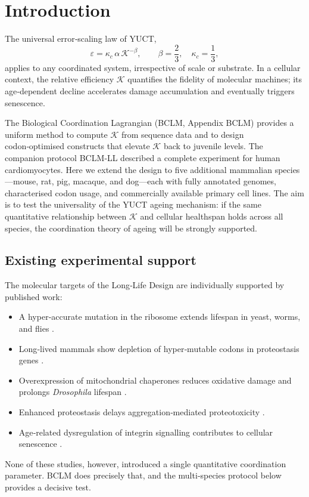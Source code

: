 \documentclass[12pt,a4paper]{article}
\newcommand{\REL}{\mathcal{K}}          %
\begin{document}
	\tableofcontents
	\newpage
	
	\section{Introduction}
	\label{sec:intro}
	The universal error‑scaling law of YUCT,
	\begin{equation}
		\varepsilon = \kappa_c \, \alpha \, \REL^{-\beta}, \qquad \beta = \frac{2}{3},\quad \kappa_c = \frac{1}{3},
		\label{eq:error-law}
	\end{equation}
	applies to any coordinated system, irrespective of scale or substrate. In a cellular context, the relative efficiency \(\REL\) quantifies the fidelity of molecular machines; its age‑dependent decline accelerates damage accumulation and eventually triggers senescence.
	
	The Biological Coordination Lagrangian (BCLM, Appendix BCLM) provides a uniform method to compute \(\REL\) from sequence data and to design codon‑optimised constructs that elevate \(\REL\) back to juvenile levels. The companion protocol BCLM‑LL described a complete experiment for human cardiomyocytes. Here we extend the design to five additional mammalian species—mouse, rat, pig, macaque, and dog—each with fully annotated genomes, characterised codon usage, and commercially available primary cell lines. The aim is to test the universality of the YUCT ageing mechanism: if the same quantitative relationship between \(\REL\) and cellular healthspan holds across all species, the coordination theory of ageing will be strongly supported.
	
	\subsection{Existing experimental support}
	The molecular targets of the Long‑Life Design are individually supported by published work:
	\begin{itemize}
		\item A hyper‑accurate mutation in the ribosome extends lifespan in yeast, worms, and flies \cite{Bjedov2021}.
		\item Long‑lived mammals show depletion of hyper‑mutable codons in proteostasis genes \cite{Kerekes2025}.
		\item Overexpression of mitochondrial chaperones reduces oxidative damage and prolongs \textit{Drosophila} lifespan \cite{Morrow2004}.
		\item Enhanced proteostasis delays aggregation‑mediated proteotoxicity \cite{Walker2003}.
		\item Age‑related dysregulation of integrin signalling contributes to cellular senescence \cite{Takeda2019}.
	\end{itemize}
	None of these studies, however, introduced a single quantitative coordination parameter. BCLM does precisely that, and the multi‑species protocol below provides a decisive test.
	
\end{document}
